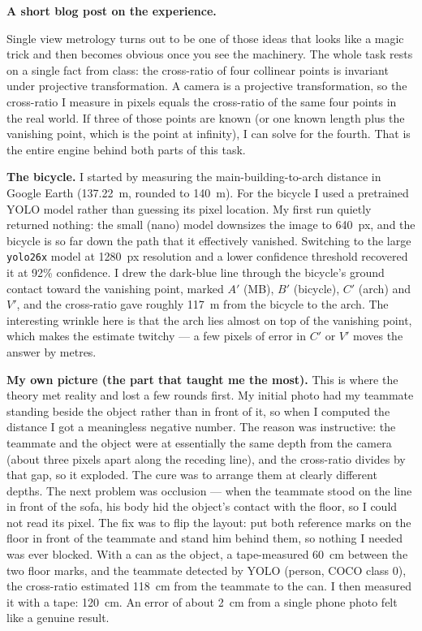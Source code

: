 \begin{studentSpace}
\textbf{A short blog post on the experience.}

Single view metrology turns out to be one of those ideas that looks like
a magic trick and then becomes obvious once you see the machinery. The
whole task rests on a single fact from class: the cross-ratio of four
collinear points is invariant under projective transformation. A camera
is a projective transformation, so the cross-ratio I measure in pixels
equals the cross-ratio of the same four points in the real world. If
three of those points are known (or one known length plus the vanishing
point, which is the point at infinity), I can solve for the fourth. That
is the entire engine behind both parts of this task.

\textbf{The bicycle.} I started by measuring the main-building-to-arch
distance in Google Earth (137.22~m, rounded to 140~m). For the bicycle I
used a pretrained YOLO model rather than guessing its pixel location. My
first run quietly returned nothing: the small (nano) model downsizes the
image to 640~px, and the bicycle is so far down the path that it
effectively vanished. Switching to the large \texttt{yolo26x} model at
1280~px resolution and a lower confidence threshold recovered it at 92\%
confidence. I drew the dark-blue line through the bicycle's ground contact
toward the vanishing point, marked $A'$ (MB), $B'$ (bicycle), $C'$ (arch)
and $V'$, and the cross-ratio gave roughly 117~m from the bicycle to the
arch. The interesting wrinkle here is that the arch lies almost on top of
the vanishing point, which makes the estimate twitchy --- a few pixels of
error in $C'$ or $V'$ moves the answer by metres.

\textbf{My own picture (the part that taught me the most).} This is where
the theory met reality and lost a few rounds first. My initial photo had
my teammate standing beside the object rather than in front of it, so when
I computed the distance I got a meaningless negative number. The reason
was instructive: the teammate and the object were at essentially the same
depth from the camera (about three pixels apart along the receding line),
and the cross-ratio divides by that gap, so it exploded. The cure was to
arrange them at clearly different depths. The next problem was occlusion
--- when the teammate stood on the line in front of the sofa, his body hid
the object's contact with the floor, so I could not read its pixel. The
fix was to flip the layout: put both reference marks on the floor in front
of the teammate and stand him behind them, so nothing I needed was ever
blocked. With a can as the object, a tape-measured 60~cm between the two
floor marks, and the teammate detected by YOLO (person, COCO class 0), the
cross-ratio estimated 118~cm from the teammate to the can. I then measured
it with a tape: 120~cm. An error of about 2~cm from a single phone photo
felt like a genuine result.


\end{studentSpace}
